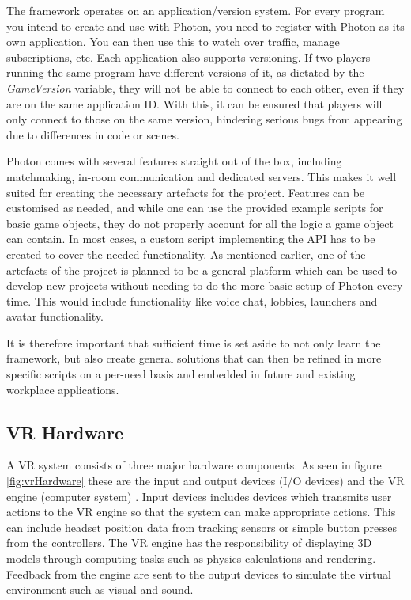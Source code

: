 The framework operates on an application/version system. For every program you intend to create and use with Photon, you need to register with Photon as its own application. You can then use this to watch over traffic, manage subscriptions, etc. Each application also supports versioning. If two players running the same program have different versions of it, as dictated by the \textit{GameVersion} variable, they will not be able to connect to each other, even if they are on the same application ID. With this, it can be ensured that players will only connect to those on the same version, hindering serious bugs from appearing due to differences in code or scenes.

Photon comes with several features straight out of the box, including matchmaking, in-room communication and dedicated servers. This makes it well suited for creating the necessary artefacts for the project. Features can be customised as needed, and while one can use the provided example scripts for basic game objects, they do not properly account for all the logic a game object can contain. In most cases, a custom script implementing the API has to be created to cover the needed functionality. As mentioned earlier, one of the artefacts of the project is planned to be a general platform which can be used to develop new projects without needing to do the more basic setup of Photon every time. This would include functionality like voice chat, lobbies, launchers and avatar functionality.

It is therefore important that sufficient time is set aside to not only learn the framework, but also create general solutions that can then be refined in more specific scripts on a per-need basis and embedded in future and existing workplace applications.



\subsection{VR Hardware}
\label{section:VRhardware}
A VR system consists of three major hardware components. As seen in figure \ref{fig:vrHardware} these are the input and output devices (I/O devices) and the VR engine (computer system) \cite{bamodu2013virtual}.  
Input devices includes devices which transmits user actions to the VR engine so that the system can make appropriate actions. This can include headset position data from tracking sensors or simple button presses from the controllers. The VR engine has the responsibility of displaying 3D models through computing tasks such as physics calculations and rendering. Feedback from the engine are sent to the output devices to simulate the virtual environment such as visual and sound.         

